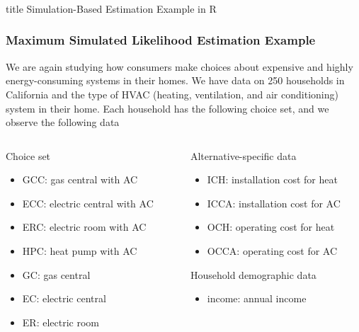 \documentclass{beamer}\usepackage[]{graphicx}\usepackage[]{color}
\begin{document}
\begin{frame}\frametitle{}
    \vfill
    \centering
    \begin{beamercolorbox}[center]{title}
        \Large Simulation-Based Estimation Example in R
    \end{beamercolorbox}
    \vfill
\end{frame}

\begin{frame}\frametitle{Maximum Simulated Likelihood Estimation Example}
    We are again studying how consumers make choices about expensive and highly energy-consuming systems in their homes. We have data on 250 households in California and the type of HVAC (heating, ventilation, and air conditioning) system in their home. Each household has the following choice set, and we observe the following data \\
    \vspace{3ex}
    \begin{columns}
    	\begin{column}{0.5\textwidth}
		    Choice set
		    \begin{itemize}
		    	\item GCC: gas central with AC
		    	\item ECC: electric central with AC
		    	\item ERC: electric room with AC
		    	\item HPC: heat pump with AC
		    	\item GC: gas central
		    	\item EC: electric central
		    	\item ER: electric room
		    \end{itemize}
		    \vspace{2ex}
	    \end{column}
	    \begin{column}{0.5\textwidth}
		    Alternative-specific data
		    \begin{itemize}
		    	\item ICH: installation cost for heat
		    	\item ICCA: installation cost for AC
		    	\item OCH: operating cost for heat
		    	\item OCCA: operating cost for AC
		    \end{itemize}
		    \vspace{2ex}
		    Household demographic data
		    \begin{itemize}
		    	\item income: annual income
		    \end{itemize}
		\end{column}
    \end{columns}
\end{frame}
\end{document}
